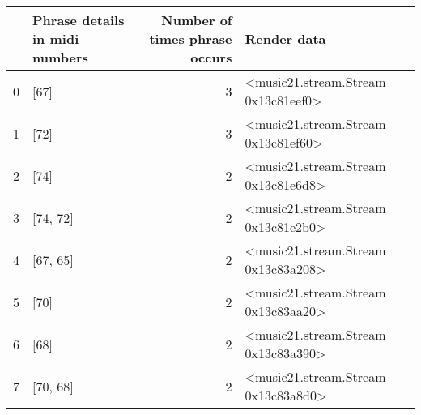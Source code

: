 \documentclass[11pt]{article}
\begin{document}
    \begin{tabular}{llrl}
\toprule
{} & Phrase details in midi numbers &  Number of times phrase occurs &                          Render data \\
\midrule
0 &  [67] &  3 &  <music21.stream.Stream 0x13c81eef0> \\
1 &  [72] &  3 &  <music21.stream.Stream 0x13c81ef60> \\
2 &  [74] &  2 &  <music21.stream.Stream 0x13c81e6d8> \\
3 &  [74, 72] &  2 &  <music21.stream.Stream 0x13c81e2b0> \\
4 &  [67, 65] &  2 &  <music21.stream.Stream 0x13c83a208> \\
5 &  [70] &  2 &  <music21.stream.Stream 0x13c83aa20> \\
6 &  [68] &  2 &  <music21.stream.Stream 0x13c83a390> \\
7 &  [70, 68] &  2 &  <music21.stream.Stream 0x13c83a8d0> \\
\bottomrule
\end{tabular}

    
\end{document}
